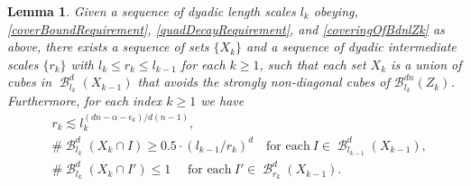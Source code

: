 \documentclass[dvipsnames,letterpaper,12pt]{article}
\numberwithin{equation}{section}
\theoremstyle{plain}
\newtheorem{lemma}{Lemma}
\theoremstyle{remark}
\DeclareMathOperator{\B}{\mathcal{B}}
\begin{document}
\begin{lemma} 
	Given a sequence of dyadic length scales $l_k$ obeying, \eqref{coverBoundRequirement}, \eqref{quadDecayRequirement}, and \eqref{coveringOfBdnlZk} as above, there exists a sequence of sets $\{X_k\}$ and a sequence of dyadic intermediate scales $\{ r_k \}$ with $l_k \leq r_k \leq l_{k-1}$ for each $k \geq 1$, such that each set $X_k$ is a union of cubes in $\B_{l_k}^d(X_{k-1})$ that avoids the strongly non-diagonal cubes of $\mathcal B_{l_k}^{dn}(Z_k)$. Furthermore, for each index $k\geq 1$ we have
	\begin{align}
		& r_k \lesssim l_k^{(dn-\alpha -\epsilon_k)/d(n-1)},\label{rkSizeBound}\\
		& \# \B^d_{l_k}(X_k \cap I) \geq 0.5 \cdot (l_{k-1}/r_k)^d \quad \text{for each}\ I\in \B_{l_{k-1}}^d(X_{k-1}), \label{manyIkInIkm1}\\
		&\# \B^d_{l_k}(X_k \cap I') \leq 1 \quad \text{ for each}\ I' \in \B_{r_{k}}^d(X_{k-1}).\label{XkWellDistributed}
	\end{align}
\end{lemma}
\end{document}
